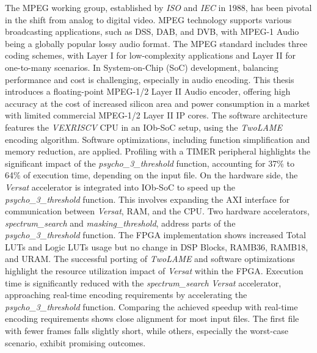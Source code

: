 The MPEG working group, established by \textit{ISO} and \textit{IEC} in 1988, has been pivotal in the shift from analog to digital video. MPEG technology supports various broadcasting applications, such as DSS, DAB, and DVB, with MPEG-1 Audio being a globally popular lossy audio format. The MPEG standard includes three coding schemes, with Layer I for low-complexity applications and Layer II for one-to-many scenarios.
In System-on-Chip (SoC) development, balancing performance and cost is challenging, especially in audio encoding. This thesis introduces a floating-point MPEG-1/2 Layer II Audio encoder, offering high accuracy at the cost of increased silicon area and power consumption in a market with limited commercial MPEG-1/2 Layer II IP cores.
The software architecture features the \textit{VEXRISCV} CPU in an IOb-SoC setup, using the \textit{TwoLAME} encoding algorithm. Software optimizations, including function simplification and memory reduction, are applied. Profiling with a TIMER peripheral highlights the significant impact of the \textit{psycho\_3\_threshold} function, accounting for 37\% to 64\% of execution time, depending on the input file.
On the hardware side, the \textit{Versat} accelerator is integrated into IOb-SoC to speed up the \textit{psycho\_3\_threshold} function. This involves expanding the AXI interface for communication between \textit{Versat}, RAM, and the CPU. Two hardware accelerators, \textit{spectrum\_search} and \textit{masking\_threshold}, address parts of the \textit{psycho\_3\_threshold} function. The FPGA implementation shows increased Total LUTs and Logic LUTs usage but no change in DSP Blocks, RAMB36, RAMB18, and URAM.
The successful porting of \textit{TwoLAME} and software optimizations highlight the resource utilization impact of \textit{Versat} within the FPGA. Execution time is significantly reduced with the \textit{spectrum\_search} \textit{Versat} accelerator, approaching real-time encoding requirements by accelerating the \textit{psycho\_3\_threshold} function.
Comparing the achieved speedup with real-time encoding requirements shows close alignment for most input files. The first file with fewer frames falls slightly short, while others, especially the worst-case scenario, exhibit promising outcomes.

